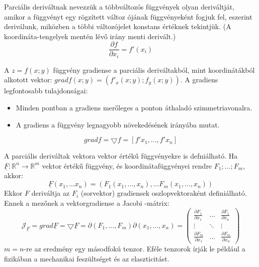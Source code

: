 \documentclass[11pt,a4paper]{article}
\begin{document}
\begin{tcolorbox}[colback=blue!5!white,colframe=blue!70!black,title= 4. Parciális derivált]
    Parciális deriváltnak nevezzük a többváltozós függvények olyan deriváltját, amikor a függvényt egy rögzített változ
    ójának függvényeként fogjuk fel, eszerint deriválunk, miközben a többi változójelet konstans értéknek tekintjük. (A
    koordináta-tengelyek mentén lévő irány menti derivált.)
$$\frac{\partial f}{\partial x_i} = f'(x_i)$$
\end{tcolorbox}
\begin{tcolorbox}[colback=blue!5!white,colframe=blue!70!black,title= 5. Gradiens]
    A \(z = f(x; y)\) függvény gradiense a parciális deriváltakból, mint koordinátákból alkotott vektor: \(gradf(x; y) =
    (f'_x(x; y); f_y(x; y))\). A gradiens legfontosabb tulajdonságai:
    \begin{itemize}
        \item Minden pontban a gradiens merőleges a ponton áthaladó szimmetriavonalra.
        \item A gradiens a függvény legnagyobb növekedésének irányába mutat.
    \end{itemize}
    $$gradf = \bigtriangledown f = [f'x_1, ..., f'x_n]$$
\end{tcolorbox}
\begin{tcolorbox}[colback=blue!5!white,colframe=blue!70!black,title= 6. Jacobi-mátrix]
    A parciális deriváltak vektora vektor értékű függvényekre is defniálható. Ha \( \underline{F} : \mathbb{R}^n \to \mathbb{R}^m\) vektor értékű függvény,
    és koordinátafüggvényei rendre \(F_1; ...; F_m\), akkor:
    $$\underline{F}(x_1,...x_n) = (F_1(x_1,..., x_n), ... F_m(x_1, ..., x_n))$$
    Ekkor \(F\) deriváltja az \(F_i\) (sorvektor) gradiensek oszlopvektoraként definiálható. Ennek a mezőnek a vektorgradiense
a Jacobi -mátrix:
$$\mathcal{J}_{\underline{F}} = grad\underline{F} = \bigtriangledown \underline{F} = \partial (F_1, ..., F_m)\partial(x_1, ..., x_n) = \begin{pmatrix}
    \frac{\partial F_1}{\partial x_1} & ... &\frac{\partial F_1}{\partial x_n} \\ 
     \vdots & \ddots  &\vdots \\ 
    \frac{\partial F_m}{\partial x_1}& ... & \frac{\partial F_m}{\partial x_n}
    \end{pmatrix} $$
    \(m=n\)-re az eredmény egy másodfokú tenzor. Eféle tenzorok írják le például a fizikában a mechanikai feszültséget és
az elaszticitást.
\end{tcolorbox}
\end{document}
